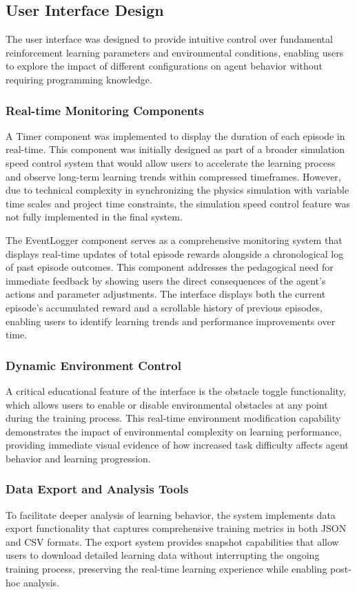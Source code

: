 \subsection{User Interface Design}
The user interface was designed to provide intuitive control over fundamental reinforcement learning parameters and environmental conditions, enabling users to explore the impact of different configurations on agent behavior without requiring programming knowledge.

\subsubsection{Real-time Monitoring Components}
A Timer component was implemented to display the duration of each episode in real-time. This component was initially designed as part of a broader simulation speed control system that would allow users to accelerate the learning process and observe long-term learning trends within compressed timeframes. However, due to technical complexity in synchronizing the physics simulation with variable time scales and project time constraints, the simulation speed control feature was not fully implemented in the final system.

The EventLogger component serves as a comprehensive monitoring system that displays real-time updates of total episode rewards alongside a chronological log of past episode outcomes. This component addresses the pedagogical need for immediate feedback by showing users the direct consequences of the agent's actions and parameter adjustments. The interface displays both the current episode's accumulated reward and a scrollable history of previous episodes, enabling users to identify learning trends and performance improvements over time.

\subsubsection{Dynamic Environment Control}
A critical educational feature of the interface is the obstacle toggle functionality, which allows users to enable or disable environmental obstacles at any point during the training process. This real-time environment modification capability demonstrates the impact of environmental complexity on learning performance, providing immediate visual evidence of how increased task difficulty affects agent behavior and learning progression.

\subsubsection{Data Export and Analysis Tools}
To facilitate deeper analysis of learning behavior, the system implements data export functionality that captures comprehensive training metrics in both JSON and CSV formats. The export system provides snapshot capabilities that allow users to download detailed learning data without interrupting the ongoing training process, preserving the real-time learning experience while enabling post-hoc analysis.